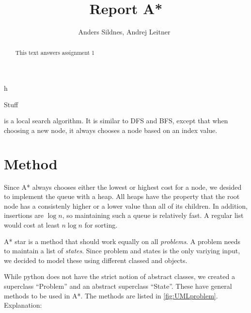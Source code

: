 \documentclass[journal]{IEEEtran}
\begin{document}
%
\title{Report A*}

\author{Anders Sildnes, Andrej Leitner~%
}%

%
{h}

\maketitle

\begin{abstract}
    This text answers assignment 1
\end{abstract}

\begin{IEEEkeywords}
    Stuff
\end{IEEEkeywords}
 is a local search algorithm. It is similar to DFS and BFS,
except that when choosing a new node, it always chooses a node based on an 
index value. 

\section{Method}
Since A* always chooses either the lowest or highest cost for a node, we desided
to implement the queue with a heap. All heaps have the property that the root
node has a consistenly higher or a lower value than all of its children. In addition,
insertions are $\log{n}$, so maintaining such a queue is relatively fast. A 
regular list would cost at least $n \log{n}$ for sorting.

A* star is a method that should work equally on all \textit{problems}. A problem needs
to maintain a list of \textit{states}. Since problem and states is the only 
variying input, we decided to model these using different classed and objects.

While python does not have the strict notion of abstract classes, we created
a superclass ``Problem'' and an abstract superclass ``State''. These have
general methods to be used in A*. The methods are listed in \autoref{fig:UMLproblem}.
Explanation:
\end{document}
